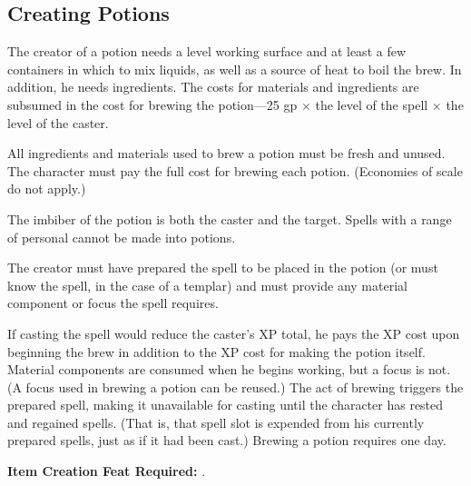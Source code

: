 \subsection{Creating Potions}
The creator of a potion needs a level working surface and at least a few containers in which to mix liquids, as well as a source of heat to boil the brew. In addition, he needs ingredients. The costs for materials and ingredients are subsumed in the cost for brewing the potion---25 gp $\times$ the level of the spell $\times$ the level of the caster.

All ingredients and materials used to brew a potion must be fresh and unused. The character must pay the full cost for brewing each potion. (Economies of scale do not apply.)

The imbiber of the potion is both the caster and the target. Spells with a range of personal cannot be made into potions.

The creator must have prepared the spell to be placed in the potion (or must know the spell, in the case of a templar) and must provide any material component or focus the spell requires.

If casting the spell would reduce the caster's XP total, he pays the XP cost upon beginning the brew in addition to the XP cost for making the potion itself. Material components are consumed when he begins working, but a focus is not. (A focus used in brewing a potion can be reused.) The act of brewing triggers the prepared spell, making it unavailable for casting until the character has rested and regained spells. (That is, that spell slot is expended from his currently prepared spells, just as if it had been cast.) Brewing a potion requires one day.

\textbf{Item Creation Feat Required:} .




